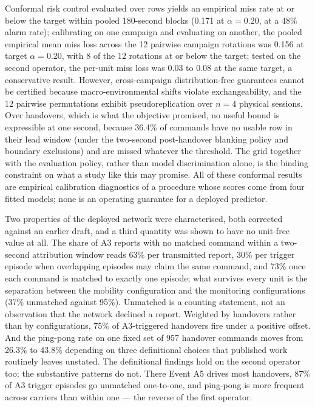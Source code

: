 Conformal risk control evaluated over rows yields an empirical miss rate at or below the target within pooled 180-second blocks (0.171 at $\alpha = 0.20$, at a 48\% alarm rate); calibrating on one campaign and evaluating on another, the pooled empirical mean miss loss across the 12 pairwise campaign rotations was 0.156 at target $\alpha = 0.20$, with 8 of the 12 rotations at or below the target; tested on the second operator, the per-unit miss loss was 0.03 to 0.08 at the same target, a conservative result. However, cross-campaign distribution-free guarantees cannot be certified because macro-environmental shifts violate exchangeability, and the 12 pairwise permutations exhibit pseudoreplication over $n=4$ physical sessions. Over handovers, which is what the objective promised, no useful bound is expressible at one second, because 36.4\% of commands have no usable row in their lead window (under the two-second post-handover blanking policy and boundary exclusions) and are missed whatever the threshold. The grid together with the evaluation policy, rather than model discrimination alone, is the binding constraint on what a study like this may promise. All of these conformal results are empirical calibration diagnostics of a procedure whose scores come from four fitted models; none is an operating guarantee for a deployed predictor.

Two properties of the deployed network were characterised, both corrected against an earlier draft, and a third quantity was shown to have no unit-free value at all. The share of A3 reports with no matched command within a two-second attribution window reads 63\% per transmitted report, 30\% per trigger episode when overlapping episodes may claim the same command, and 73\% once each command is matched to exactly one episode; what survives every unit is the separation between the mobility configuration and the monitoring configurations (37\% unmatched against 95\%). Unmatched is a counting statement, not an observation that the network declined a report. Weighted by handovers rather than by configurations, 75\% of A3-triggered handovers fire under a positive offset. And the ping-pong rate on one fixed set of 957 handover commands moves from 26.3\% to 43.8\% depending on three definitional choices that published work routinely leaves unstated. The definitional findings hold on the second operator too; the substantive patterns do not. There Event A5 drives most handovers, 87\% of A3 trigger episodes go unmatched one-to-one, and ping-pong is more frequent across carriers than within one --- the reverse of the first operator.

